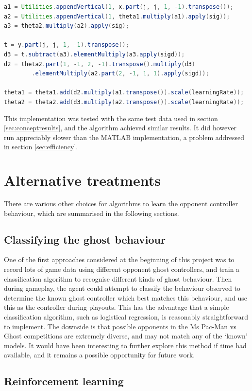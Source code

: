 \begin{lstlisting}[language=Java,label=lst:javanet,caption={Java neural network code},captionpos=b]
a1 = Utilities.appendVertical(1, x.part(j, j, 1, -1).transpose());
a2 = Utilities.appendVertical(1, theta1.multiply(a1).apply(sig));
a3 = theta2.multiply(a2).apply(sig);

t = y.part(j, j, 1, -1).transpose();
d3 = t.subtract(a3).elementMultiply(a3.apply(sigd));
d2 = theta2.part(1, -1, 2, -1).transpose().multiply(d3)
        .elementMultiply(a2.part(2, -1, 1, 1).apply(sigd));

theta1 = theta1.add(d2.multiply(a1.transpose()).scale(learningRate));
theta2 = theta2.add(d3.multiply(a2.transpose()).scale(learningRate));
\end{lstlisting}

This implementation was tested with the same test data used in section \ref{sec:conceptresults}, and the algorithm achieved similar results.  It did however run appreciably slower than the MATLAB implementation, a problem addressed in section \ref{sec:efficiency}.

\section{Alternative treatments}

There are various other choices for algorithms to learn the opponent controller behaviour, which are summarised in the following sections.

\subsection{Classifying the ghost behaviour}

One of the first approaches considered at the beginning of this project was to record lots of game data using different opponent ghost controllers, and train a classification algorithm to recognise different kinds of ghost behaviour.  Then during gameplay, the agent could attempt to classify the behaviour observed to determine the known ghost controller which best matches this behaviour, and use this as the controller during playouts.  This has the advantage that a simple classification algorithm, such as logistical regression, is reasonably straightforward to implement.  The downside is that possible opponents in the Ms Pac-Man vs Ghost competitions are extremely diverse, and may not match any of the `known' models.  It would have been interesting to further explore this method if time had available, and it remains a possible opportunity for future work.

\subsection{Reinforcement learning}




